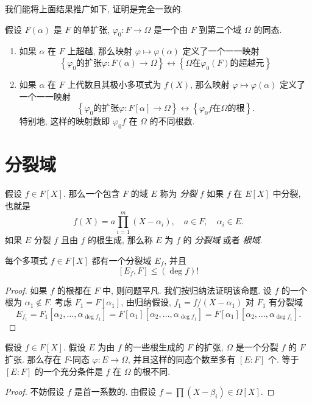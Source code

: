 我们能将上面结果推广如下, 证明是完全一致的.
\begin{proposition}
  假设 \( F(\alpha) \) 是 \( F \) 的单扩张, \( \varphi_0: F \to \Omega \)
  是一个由 \( F \) 到第二个域 \( \Omega \) 的同态.
  \begin{enumerate}
    \item 如果 \( \alpha \) 在 \( F \) 上超越, 那么映射 \( \varphi \mapsto
      \varphi(\alpha) \) 定义了一个一一映射
      \[
        \left\lbrace \varphi_0 \text{的扩张} \varphi: F(\alpha) \to \Omega
        \right\rbrace \leftrightarrow \left\lbrace \Omega \text{在} \varphi_0(F)
        \text{的超越元} \right\rbrace
      \]
    \item 如果 \( \alpha \) 在 \( F \) 上代数且其极小多项式为 \( f(X) \),
      那么映射 \( \varphi \mapsto \varphi(\alpha) \) 定义了一个一一映射
      \[
        \left\lbrace \varphi_0 \text{的扩张} \varphi: F[\alpha] \to \Omega
        \right\rbrace \leftrightarrow \left\lbrace \varphi_0 f \text{在} \Omega
        \text{的根} \right\rbrace.
      \]
      特别地, 这样的映射数即 \( \varphi_0f \) 在 \( \Omega \) 的不同根数.
  \end{enumerate}
\end{proposition}

\section{分裂域}

假设 \( f \in F[X] \). 那么一个包含 \( F \) 的域 \( E \) 称为 \emph{分裂} \( f
\) 如果 \( f \) 在 \( E[X] \) 中分裂, 也就是
\[
  f(X) = a \prod_{i = 1}^m(X - \alpha_i),\quad a \in F,\quad \alpha_i \in E.
\]
如果 \( E \) 分裂 \( f \) 且由 \( f \) 的根生成, 那么称 \( E \) 为 \( f \) 的
\emph{分裂域} 或者 \emph{根域}.

\begin{proposition}
  每个多项式 \( f \in F[X] \) 都有一个分裂域 \( E_f \), 并且
  \[
    [E_f, F] \leq (\deg f) !
  \]
\end{proposition}
\begin{proof}
  如果 \( f \) 的根都在 \( F \) 中, 则问题平凡.
  我们按归纳法证明该命题.
  设 \( f \) 的一个根为 \( \alpha_1 \notin F \). 考虑 \( F_1 = F[\alpha_1] \),
  由归纳假设, \( f_1 = {f} / {(X - \alpha_1)} \) 对 \( F_1 \) 有分裂域
  \[
    E_{f_1} = F_1[\alpha_2, \ldots, \alpha_{\deg f_1}] = F[\alpha_1][\alpha_2,
    \ldots, \alpha_{\deg f_1}] = F[\alpha_1][\alpha_2, \ldots, \alpha_{\deg
    f_1}].
  \]
\end{proof}

\begin{proposition}
  假设 \( f \in F[X] \). 假设 \( E \) 为由 \( f \) 的一些根生成的 \( F \) 的扩张, \(
  \Omega\) 是一个分裂 \( f \) 的 \( F \) 扩张. 那么存在 \( F \)-同态 \( \varphi:
  E \to \Omega \), 并且这样的同态个数至多有 \( [E : F] \) 个. 等于 \( [E : F] \)
  的一个充分条件是 \( f \) 在 \( \Omega \) 的根不同.
\end{proposition}
\begin{proof}
  不妨假设 \( f \) 是首一系数的. 由假设 \( f = \prod (X - \beta_i) \in \Omega[X]
  \).
\end{proof}
